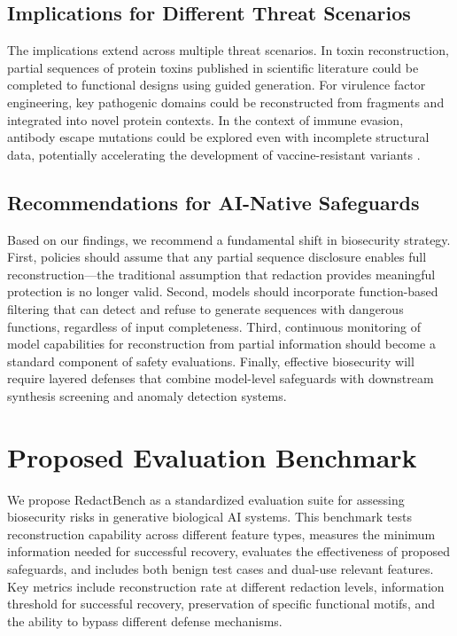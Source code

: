 \documentclass{article}
\begin{document}
\subsection{Implications for Different Threat Scenarios}

The implications extend across multiple threat scenarios. In toxin reconstruction, partial sequences of protein toxins published in scientific literature could be completed to functional designs using guided generation. For virulence factor engineering, key pathogenic domains could be reconstructed from fragments and integrated into novel protein contexts. In the context of immune evasion, antibody escape mutations could be explored even with incomplete structural data, potentially accelerating the development of vaccine-resistant variants \cite{casadevall2014need}.

\subsection{Recommendations for AI-Native Safeguards}

Based on our findings, we recommend a fundamental shift in biosecurity strategy. First, policies should assume that any partial sequence disclosure enables full reconstruction—the traditional assumption that redaction provides meaningful protection is no longer valid. Second, models should incorporate function-based filtering that can detect and refuse to generate sequences with dangerous functions, regardless of input completeness. Third, continuous monitoring of model capabilities for reconstruction from partial information should become a standard component of safety evaluations. Finally, effective biosecurity will require layered defenses that combine model-level safeguards with downstream synthesis screening and anomaly detection systems.

\section{Proposed Evaluation Benchmark}

We propose RedactBench as a standardized evaluation suite for assessing biosecurity risks in generative biological AI systems. This benchmark tests reconstruction capability across different feature types, measures the minimum information needed for successful recovery, evaluates the effectiveness of proposed safeguards, and includes both benign test cases and dual-use relevant features. Key metrics include reconstruction rate at different redaction levels, information threshold for successful recovery, preservation of specific functional motifs, and the ability to bypass different defense mechanisms.
\end{document}
